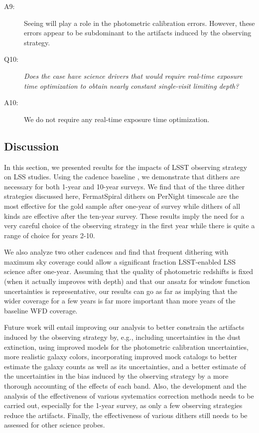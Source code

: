 \begin{description}
\item[A9:] Seeing will play a role in the photometric calibration
errors. However, these errors appear to be subdominant to the artifacts
induced by the observing strategy.

\item[Q10:] {\it Does the case have science drivers that would require
real-time exposure time optimization to obtain nearly constant
single-visit limiting depth?}

\item[A10:] We do not require any real-time exposure time optimization.

\end{description}

\subsection{Discussion}
\label{sec:\secname:discussion}

In this section, we presented results for the impacts of LSST observing
strategy on LSS studies. Using the \OpSim cadence baseline
, we demonstrate that dithers are necessary
for both 1-year and 10-year surveys. We find that of the three dither strategies
discussed here, FermatSpiral dithers on PerNight  timescale are the most
effective for the gold sample after one-year of survey while  dithers of all kinds
are effective after the ten-year survey. These results imply the need for a very careful
choice of the observing strategy in the first year while there is quite a range of choice
for years 2-10.

We also analyze two other cadences and find  that frequent dithering with
maximum  sky coverage could allow a significant  fraction LSST-enabled LSS
science after  one-year. Assuming that the quality of photometric redshifts is
fixed (when it actually improves with depth) and that our ansatz for window
function uncertainties is representative,  our results can go as far as implying
that the wider coverage for a few years is far more important than more years of the
baseline  WFD coverage.

Future work will entail improving our analysis to better constrain the
artifacts induced by the observing strategy by, e.g., including
uncertainties in the dust extinction, using improved models for the
photometric calibration uncertainties, more realistic galaxy colors,
incorporating improved mock catalogs to better estimate the galaxy
counts as well as its uncertainties, and a better estimate of the
uncertainties in the bias induced by the observing strategy by a more thorough accounting of the
effects of each band. Also, the development and the analysis of the
effectiveness of various systematics correction methods needs to be
carried out, especially for the 1-year survey, as only a few observing
strategies reduce the artifacts. Finally, the effectiveness
of various dithers still needs to be assessed for other science probes.


